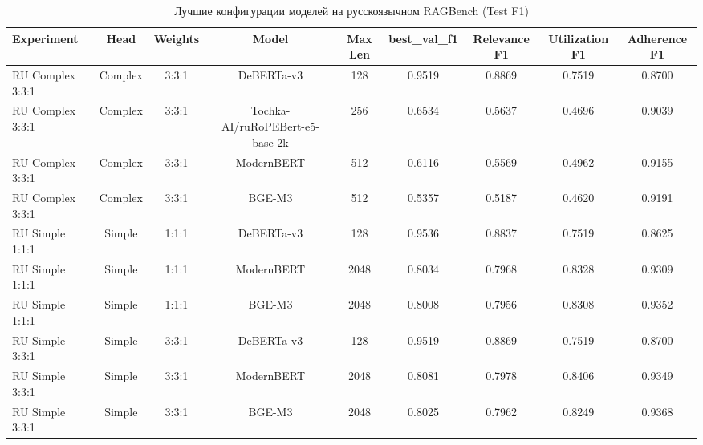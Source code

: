 \begin{table}
\caption{Лучшие конфигурации моделей на русскоязычном RAGBench (Test F1)}
\label{tab:best_ru_results}
\begin{tabular}{lcccccccc}
\toprule
Experiment & Head & Weights & Model & Max Len & best\_val\_f1 & Relevance F1 & Utilization F1 & Adherence F1 \\
\midrule
RU Complex 3:3:1 & Complex & 3:3:1 & DeBERTa-v3 & 128 & 0.9519 & 0.8869 & 0.7519 & 0.8700 \\
RU Complex 3:3:1 & Complex & 3:3:1 & Tochka-AI/ruRoPEBert-e5-base-2k & 256 & 0.6534 & 0.5637 & 0.4696 & 0.9039 \\
RU Complex 3:3:1 & Complex & 3:3:1 & ModernBERT & 512 & 0.6116 & 0.5569 & 0.4962 & 0.9155 \\
RU Complex 3:3:1 & Complex & 3:3:1 & BGE-M3 & 512 & 0.5357 & 0.5187 & 0.4620 & 0.9191 \\
RU Simple 1:1:1 & Simple & 1:1:1 & DeBERTa-v3 & 128 & 0.9536 & 0.8837 & 0.7519 & 0.8625 \\
RU Simple 1:1:1 & Simple & 1:1:1 & ModernBERT & 2048 & 0.8034 & 0.7968 & 0.8328 & 0.9309 \\
RU Simple 1:1:1 & Simple & 1:1:1 & BGE-M3 & 2048 & 0.8008 & 0.7956 & 0.8308 & 0.9352 \\
RU Simple 3:3:1 & Simple & 3:3:1 & DeBERTa-v3 & 128 & 0.9519 & 0.8869 & 0.7519 & 0.8700 \\
RU Simple 3:3:1 & Simple & 3:3:1 & ModernBERT & 2048 & 0.8081 & 0.7978 & 0.8406 & 0.9349 \\
RU Simple 3:3:1 & Simple & 3:3:1 & BGE-M3 & 2048 & 0.8025 & 0.7962 & 0.8249 & 0.9368 \\
\bottomrule
\end{tabular}
\end{table}
